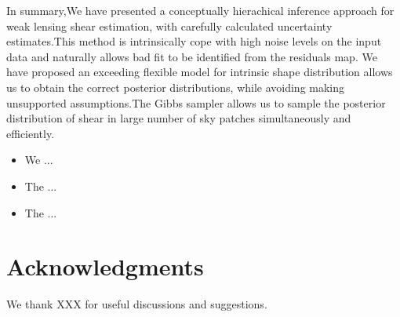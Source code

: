 \documentclass[useAMS,usenatbib]{mn2e}
\begin{document}
\label{sec:conclusions}

In summary,We have presented a conceptually hierachical inference
approach for weak lensing shear estimation, with carefully calculated 
uncertainty estimates.This method is intrinsically cope with high noise
levels on the input data and naturally allows bad fit to be identified 
from the residuals map. We have proposed an exceeding flexible model for 
intrinsic shape distribution allows us to obtain the correct posterior 
distributions, while avoiding making unsupported assumptions.The Gibbs
sampler allows us to sample the posterior distribution of shear in large number of
sky patches simultaneously and efficiently.
\begin{itemize}
\item We ...
\item The ...
\item The ...
\end{itemize}



\section*{Acknowledgments}

We thank XXX for useful discussions and suggestions.



% 
% 
% 
% 






 





\label{lastpage} \bsp
\end{document}
